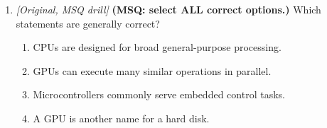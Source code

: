 \begin{enumerate}[label=\textbf{Q\arabic*.}, leftmargin=*]
\item \textit{[Original, MSQ drill]} \textbf{(MSQ: select ALL correct options.)} Which statements are generally correct?
  \begin{enumerate}[label=\Alph*.]
\item CPUs are designed for broad general-purpose processing.
   \item GPUs can execute many similar operations in parallel.
   \item Microcontrollers commonly serve embedded control tasks.
   \item A GPU is another name for a hard disk.
  \end{enumerate}

\end{enumerate}
